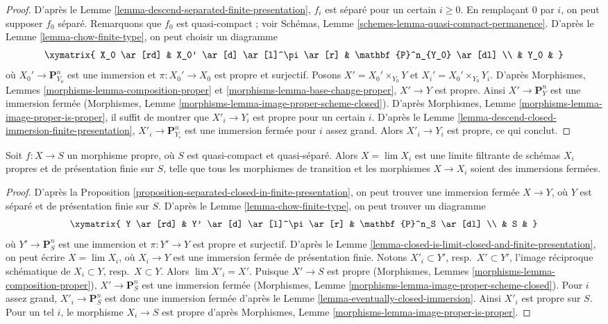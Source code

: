 \begin{proof}
D'après le Lemme \ref{lemma-descend-separated-finite-presentation},
$f_i$ est séparé pour un certain $i \geq 0$. En remplaçant
$0$ par $i$, on peut supposer $f_0$ séparé.
Remarquons que $f_0$ est quasi-compact ; voir
Schémas, Lemme \ref{schemes-lemma-quasi-compact-permanence}.
D'après le Lemme \ref{lemma-chow-finite-type}, on peut choisir un diagramme
$$
\xymatrix{
X_0 \ar[rd] & X_0' \ar[d] \ar[l]^\pi \ar[r] & \mathbf{P}^n_{Y_0} \ar[dl] \\
& Y_0 &
}
$$
où $X_0' \to \mathbf{P}^n_{Y_0}$ est une immersion et
$\pi : X_0' \to X_0$ est propre et surjectif. Posons
$X' = X_0' \times_{Y_0} Y$ et $X_i' = X_0' \times_{Y_0} Y_i$.
D'après Morphismes, Lemmes \ref{morphisms-lemma-composition-proper} et
\ref{morphisms-lemma-base-change-proper},
$X' \to Y$ est propre. Ainsi $X' \to \mathbf{P}^n_Y$ est
une immersion fermée (Morphismes, Lemme
\ref{morphisms-lemma-image-proper-scheme-closed}). D'après
Morphismes, Lemme \ref{morphisms-lemma-image-proper-is-proper},
il suffit de montrer que $X'_i \to Y_i$ est propre pour un certain $i$.
D'après le Lemme \ref{lemma-descend-closed-immersion-finite-presentation},
$X'_i \to \mathbf{P}^n_{Y_i}$ est
une immersion fermée pour $i$ assez grand. Alors $X'_i \to Y_i$
est propre, ce qui conclut.
\end{proof}

\begin{lemma}
\label{lemma-proper-limit-of-proper-finite-presentation}
Soit $f : X \to S$ un morphisme propre, où $S$ est quasi-compact et
quasi-séparé. Alors $X = \lim X_i$ est une limite filtrante de schémas
$X_i$ propres et de présentation finie sur $S$, telle que
tous les morphismes de transition et les morphismes $X \to X_i$ soient des immersions
fermées.
\end{lemma}

\begin{proof}
D'après la Proposition \ref{proposition-separated-closed-in-finite-presentation},
on peut trouver une immersion fermée $X \to Y$, où $Y$ est séparé et de
présentation finie sur $S$. D'après le Lemme \ref{lemma-chow-finite-type},
on peut trouver un diagramme
$$
\xymatrix{
Y \ar[rd] & Y' \ar[d] \ar[l]^\pi \ar[r] & \mathbf{P}^n_S \ar[dl] \\
& S &
}
$$
où $Y' \to \mathbf{P}^n_S$ est une immersion et
$\pi : Y' \to Y$ est propre et surjectif. D'après le
Lemme \ref{lemma-closed-is-limit-closed-and-finite-presentation},
on peut écrire $X = \lim X_i$, où $X_i \to Y$ est une immersion fermée de
présentation finie. Notons $X'_i \subset Y'$, resp.\ $X' \subset Y'$,
l'image réciproque schématique de $X_i \subset Y$, resp.\ $X \subset Y$.
Alors $\lim X'_i = X'$. Puisque $X' \to S$ est propre
(Morphismes, Lemmes \ref{morphisms-lemma-composition-proper}),
$X' \to \mathbf{P}^n_S$ est une immersion fermée (Morphismes, Lemme
\ref{morphisms-lemma-image-proper-scheme-closed}). Pour $i$ assez grand,
$X'_i \to \mathbf{P}^n_S$ est donc une immersion fermée d'après le
Lemme \ref{lemma-eventually-closed-immersion}.
Ainsi $X'_i$ est propre sur $S$.
Pour un tel $i$, le morphisme $X_i \to S$ est propre d'après
Morphismes, Lemme \ref{morphisms-lemma-image-proper-is-proper}.
\end{proof}

